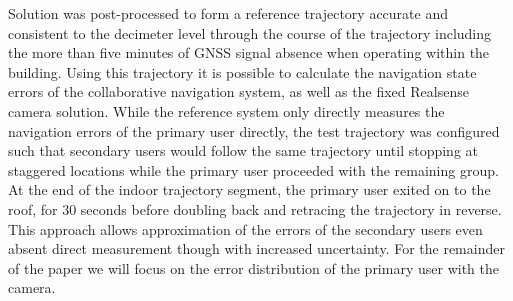 Solution
was post-processed to form a reference trajectory accurate
and consistent to the decimeter level through the course of
the trajectory including the more than five minutes of GNSS
signal absence when operating within the building. Using this
trajectory it is possible to calculate the navigation state errors
of the collaborative navigation system, as well as the fixed
Realsense camera solution. While the reference system only
directly measures the navigation errors of the primary user
directly, the test trajectory was configured such that secondary
users would follow the same trajectory until stopping at
staggered locations while the primary user proceeded with the
remaining group. At the end of the indoor trajectory segment,
the primary user exited on to the roof, for 30 seconds before doubling back and retracing the trajectory in reverse. This
approach allows approximation of the errors of the secondary
users even absent direct measurement though with increased
uncertainty. For the remainder of the paper we will focus on
the error distribution of the primary user with the camera.

